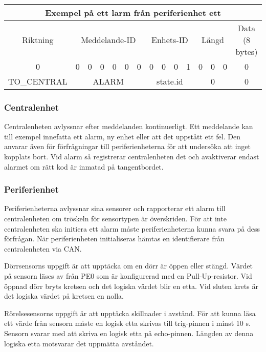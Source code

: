 \documentclass[a4paper]{article}
\begin{document}
\begin{table}[H]
    \centering
    \begin{tabular}{|c|c|c|c|c|c|c|c|c|c|c|c|c|c|c|}\hline
        \multicolumn{15}{|c|}{Exempel på ett larm från periferienhet ett}\\\hline
        \multicolumn{1}{|c|}{Riktning} & \multicolumn{6}{|c|}{Meddelande-ID} & \multicolumn{4}{|c|}{Enhets-ID} & \multicolumn{3}{|c|}{Längd} & \multicolumn{1}{|c|}{Data (8 bytes)} \\\hline
        0 & 0 & 0 & 0 & 0 & 0 & 0 & 0 & 0 & 0 & 1 & 0 & 0 & 0 & 0 \\\hline
        \multicolumn{1}{|c|}{TO\_CENTRAL} & \multicolumn{6}{|c|}{ALARM} & \multicolumn{4}{|c|}{state.id} & \multicolumn{3}{|c|}{0} & \multicolumn{1}{|c|}{0} \\\hline
    \end{tabular}
\end{table}

\subsubsection{Centralenhet}
Centralenheten avlyssnar efter meddelanden kontinuerligt.
Ett meddelande kan till exempel innefatta ett alarm, ny enhet eller att det uppstått ett fel.
Den anvarar även för förfrågningar till periferienheterna för att undersöka att inget kopplats bort.
Vid alarm så registrerar centralenheten det och avaktiverar endast alarmet om rätt kod är inmatad på tangentbordet.

\subsubsection{Periferienhet}
Periferienheterna avlyssnar sina sensorer och rapporterar ett alarm till centralenheten om tröskeln för sensortypen är överskriden.
För att inte centralenheten ska initiera ett alarm måste periferienheterna kunna svara på dess förfrågan.
När periferienheten initialiseras hämtas en identifierare från centralenheten via CAN.

Dörrsensorns uppgift är att upptäcka om en dörr är öppen eller stängd.
Värdet på sensorn läses av från PE0 som är konfigurerad med en Pull-Up-resistor.
Vid öppnad dörr bryts kretsen och det logiska värdet blir en etta.
Vid sluten krets är det logiska värdet på kretsen en nolla.

Rörelsesensorns uppgift är att upptäcka skillnader i avstånd.
För att kunna läsa ett värde från sensorn måste en logisk etta skrivas till trig-pinnen i minst 10 \textmu s.
Sensorn svarar med att skriva en logisk etta på echo-pinnen.
Längden av denna logiska etta motsvarar det uppmätta avståndet.
\end{document}
